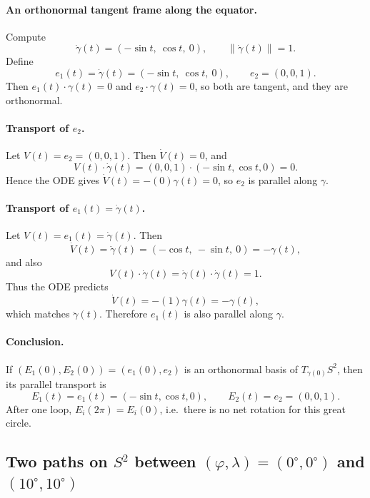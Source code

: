 \documentclass[12pt,a4paper]{article}
\theoremstyle{plain}
\theoremstyle{definition}      %
\begin{document}
\paragraph{An orthonormal tangent frame along the equator.}
Compute
\[
\dot\gamma(t)=(-\sin t,\ \cos t,\ 0),\qquad \|\dot\gamma(t)\|=1.
\]
Define
\[
e_1(t)=\dot\gamma(t)=(-\sin t,\ \cos t,\ 0),\qquad e_2=(0,0,1).
\]
Then $e_1(t)\cdot \gamma(t)=0$ and $e_2\cdot \gamma(t)=0$, so both are tangent, and they are orthonormal.

\paragraph{Transport of $e_2$.}
Let $V(t)=e_2=(0,0,1)$. Then $\dot V(t)=0$, and
\[
V(t)\cdot \dot\gamma(t)=(0,0,1)\cdot(-\sin t,\cos t,0)=0.
\]
Hence the ODE gives $\dot V(t)=-(0)\gamma(t)=0$, so $e_2$ is parallel along $\gamma$.

\paragraph{Transport of $e_1(t)=\dot\gamma(t)$.}
Let $V(t)=e_1(t)=\dot\gamma(t)$. Then
\[
\dot V(t)=\ddot\gamma(t)=(-\cos t,\ -\sin t,\ 0)=-\gamma(t),
\]
and also
\[
V(t)\cdot \dot\gamma(t)=\dot\gamma(t)\cdot \dot\gamma(t)=1.
\]
Thus the ODE predicts
\[
\dot V(t)=-(1)\gamma(t)=-\gamma(t),
\]
which matches $\ddot\gamma(t)$. Therefore $e_1(t)$ is also parallel along $\gamma$.

\paragraph{Conclusion.}
If $(E_1(0),E_2(0))=(e_1(0),e_2)$ is an orthonormal basis of $T_{\gamma(0)}S^2$, then its parallel transport is
\[
E_1(t)=e_1(t)=(-\sin t,\cos t,0),\qquad E_2(t)=e_2=(0,0,1).
\]
After one loop, $E_i(2\pi)=E_i(0)$, i.e.\ there is no net rotation for this great circle.



\subsection*{Two paths on $S^2$ between $(\varphi,\lambda)=(0^\circ,0^\circ)$ and $(10^\circ,10^\circ)$}
\end{document}
